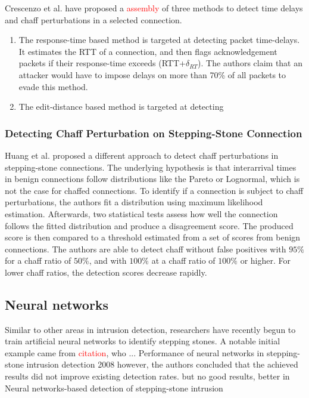 \documentclass[conference]{IEEEtran}\usepackage[]{graphicx}\usepackage[]{color}
\begin{document}
Crescenzo et al. \cite{di2011detecting} have proposed a \textcolor{red}{assembly} of three methods to detect time delays and chaff perturbations in a selected connection. 
\begin{enumerate}
\item The response-time based method is targeted at detecting packet time-delays. It estimates the RTT of a connection, and then flags acknowledgement packets if their response-time exceeds (RTT+$\delta_{RT}$). The authors claim that an attacker would have to impose delays on more than 70\% of all packets to evade this method.
\item The edit-distance based method is targeted at detecting 
\end{enumerate}

\subsubsection{Detecting Chaff Perturbation on Stepping-Stone Connection}

Huang et al. \cite{huang2011detecting} proposed a different approach to detect chaff perturbations in stepping-stone connections. The underlying hypothesis is that interarrival times in benign connections follow distributions like the Pareto or  Lognormal, which is not the case for chaffed connections. To identify if a connection is subject to chaff perturbations, the authors fit a distribution using maximum likelihood estimation. Afterwards, two statistical tests assess how well the connection follows the fitted distribution and produce a disagreement score. The produced score is then compared to a threshold estimated from a set of scores from benign connections.
The authors are able to detect chaff without false positives with $95\%$ for a chaff ratio of $50\%$, and with $100\%$ at a chaff ratio of $100\%$ or higher. For lower chaff ratios, the detection scores decrease rapidly.


\subsection{Neural networks}

Similar to other areas in intrusion detection, researchers have recently begun to train artificial neural networks to identify stepping stones. A notable initial example came from \textcolor{red}{citation}, who ...
Performance of neural networks in stepping-stone intrusion detection 2008
however, the authors concluded that the achieved results did not improve existing detection rates. but no good results, better in Neural  networks-based  detection  of stepping-stone  intrusion
\end{document}
